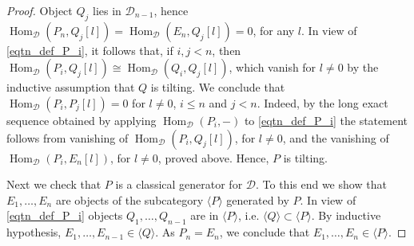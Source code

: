 \documentclass[12pt,a4paper]{amsart}
\newcommand{\dD}{{\mathcal{D}}}
\newcommand{\Hom}{\mathop{\textrm{Hom}}\nolimits}
\theoremstyle{definition}
\begin{document}
\begin{proof}
	Object $Q_j$ lies in $\dD_{n-1}$, hence $\Hom_{\dD}(P_n, Q_j[l]) = \Hom_{\dD}(E_n, Q_j[l])=0$, for any $l$.
	 In view of  \eqref{eqtn_def_P_i}, it follows that, if $i,j<n$, then $\Hom_{\dD}(P_i, Q_j[l]) \cong \Hom_{\dD}(Q_i, Q_j[l])$, which  vanish for $l \neq 0$ by the inductive assumption that $Q$ is tilting. 
	 We conclude that $\Hom_{\dD}(P_i, P_j[l]) =0$ for $l \neq 0$, $i\leq n$ and $j<n$. Indeed, by the long exact sequence obtained by applying $\Hom_{\dD}(P_i, -)$ to \eqref{eqtn_def_P_i} the statement follows from vanishing of $\Hom_{\dD}(P_i, Q_j[l])$, for $l\neq 0$, and the vanishing of $\Hom_{\dD}(P_i, E_n[l])$, for $l\neq 0$, proved above. Hence, $P$ is tilting.
	 
	
	
	Next we check that  $P$ is a classical generator for $\dD$. To this end we show 
	that $E_1,\ldots, E_n$ are objects of the subcategory $\langle P \rangle$ generated by $P$.   In view of \eqref{eqtn_def_P_i} objects $Q_1, \ldots, Q_{n-1}$ are in $\langle P \rangle$, i.e. $\langle Q \rangle \subset \langle P \rangle$. By inductive hypothesis, $E_1,\ldots, E_{n-1} \in \langle Q \rangle$. As $P_n = E_n$, we conclude that $E_1,\ldots, E_n \in \langle P \rangle$.

	

	
	

\end{proof}
\end{document}
